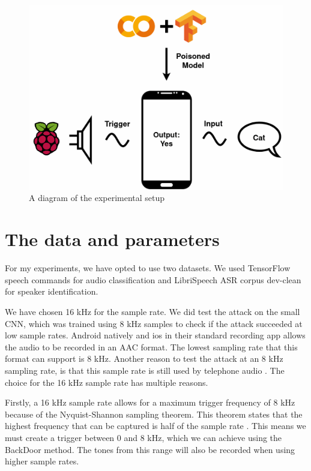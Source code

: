 \documentclass{report}
\theoremstyle{definition}
\theoremstyle{remark}
\begin{document}
\begin{figure}[!hbt]
    \centering
    \includegraphics[scale=0.2]{img/AttackDiagram.drawio.png}
    \caption{A diagram of the experimental setup}
    \label{fig:experimental-setup}
\end{figure}

\section{The data and parameters \label{DATANADPARAM}}
For my experiments, we have opted to use two datasets. We used TensorFlow speech commands \cite{Speech_commands} for audio classification and LibriSpeech ASR corpus dev-clean \cite{7178964} for speaker identification.

We have chosen 16 kHz for the sample rate. We did test the attack on the small CNN, which was trained using 8 kHz samples to check if the attack succeeded at low sample rates. Android natively \cite{AndroidMediaRecorder} and ios in their standard recording app \cite{Zeng_2019} allows the audio to be recorded in an AAC format. The lowest sampling rate that this format can support is 8 kHz. Another reason to test the attack at an 8 kHz sampling rate, is that this sample rate is still used by telephone audio \cite{rabiner1978digital}. The choice for the 16 kHz sample rate has multiple reasons.

Firstly, a 16 kHz sample rate allows for a maximum trigger frequency of 8 kHz because of the Nyquist-Shannon sampling theorem. This theorem states that the highest frequency that can be captured is half of the sample rate \cite{por2019nyquist}. This means we must create a trigger between 0 and 8 kHz, which we can achieve using the BackDoor method. The tones from this range will also be recorded when using higher sample rates. 
\end{document}
